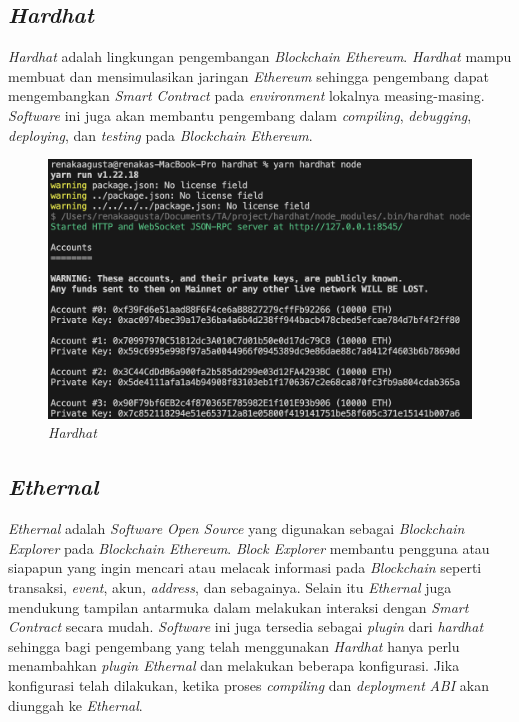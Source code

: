 \subsection{\emph{Hardhat}}

\emph{Hardhat} adalah lingkungan pengembangan \emph{Blockchain Ethereum}. \emph{Hardhat} mampu membuat dan mensimulasikan jaringan \emph{Ethereum} sehingga pengembang dapat mengembangkan \emph{Smart Contract} pada \emph{environment} lokalnya measing-masing. \emph{Software} ini juga akan membantu pengembang dalam \emph{compiling}, \emph{debugging}, \emph{deploying}, dan \emph{testing} pada \emph{Blockchain Ethereum}.
\begin{figure}[!h]
\centering 
  \includegraphics[scale=0.6]{gambar/img-hardhat.png}
  \caption{\emph{Hardhat}}
  \label{fig:Hardhat}
\end{figure}

\subsection{\emph{Ethernal}}

\emph{Ethernal} adalah \emph{Software Open Source} yang digunakan sebagai \emph{Blockchain Explorer} pada \emph{Blockchain Ethereum}. \emph{Block Explorer} membantu pengguna atau siapapun yang ingin mencari atau melacak informasi pada \emph{Blockchain} seperti transaksi, \emph{event}, akun, \emph{address}, dan sebagainya. Selain itu \emph{Ethernal} juga mendukung tampilan antarmuka dalam melakukan interaksi dengan \emph{Smart Contract} secara mudah. \emph{Software} ini juga tersedia sebagai \emph{plugin} dari \emph{hardhat} sehingga bagi pengembang yang telah menggunakan \emph{Hardhat} hanya perlu menambahkan \emph{plugin Ethernal} dan melakukan beberapa konfigurasi. Jika konfigurasi telah dilakukan, ketika proses \emph{compiling} dan \emph{deployment} \emph{ABI} akan diunggah ke \emph{Ethernal}.

